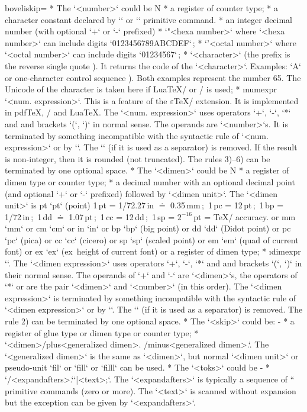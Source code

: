{\begitems \let\_aboveliskip=\relax 
* The `<number>` could be 
\begitems \style N
* a register of counter type;
* a character constant declared by \x`\chardef` or \x`\mathchardef` primitive command. 
* an integer decimal number (with optional `+` or `-` prefixed)
* {\let\,=\relax `"<hexa number>`} where `<hexa number>` can include digits
  `0123456789ABCDEF`\,;
* {\let\,=\relax`'<octal number>`} where `<octal number>` can include digits 
  `01234567`\,;
* {\let\,=\relax {}`<character>`} (the prefix is the reverse single quote ). 
  It returns the code of the `<character>`. Examples:
  `A` or one-character control sequence ).
  Both examples represent the number 65. The Unicode of the character 
  is taken here if Lua\TeX/ or \XeTeX/ is used;
* \i numexpr `\numexpr<num. expression>`.\fnote
  {This is a feature of the $\varepsilon$\TeX/ extension. It is implemented in pdf\TeX, \XeTeX/ and Lua\TeX.}
  The `<num. expression>` uses operators `+`, `-`, `*` and \code{/} and
  brackets `(`, `)` in normal sense. The operands are `<number>`s. It
  is terminated by something incompatible with
  the syntactic rule of `<num. expression>` or by `\relax`.
  The `\relax` (if it is used as a separator) is removed.
  If the result is non-integer, then it is rounded (not truncated).
\enditems
  The rules 3)--6) can be terminated by one optional space.
* The `<dimen>` could be
\begitems \style N
* a register of dimen type or counter type;
* a decimal number with an optional decimal point (and optional `+` or `-`
  prefixed) followed by `<dimen unit>`. The `<dimen unit>` is \ii pt `pt` (point)\fnote 
  {1\,pt = 1/72.27\,in $\doteq$ 0.35\,mm\,;\ 1\,pc = 12\,pt\,;\
   1\,bp = 1/72\,in\,;\ 1\,dd $\doteq$ 1.07\,pt\,;\ 1\,cc = 12\,dd\,;\
   1\,sp = $2^{-16}$\,pt = \TeX/ accuracy.}
  or \ii mm `mm` or \ii cm `cm` or \ii in `in` or 
  \ii bp `bp` (big point) or \ii dd `dd` (Didot point) or \ii pc `pc` (pica) or 
  \ii cc `cc` (cicero) or \ii sp `sp` (scaled point) or \ii em `em` (quad of current font) or
  \ii ex `ex` (ex~height of current font) or a register of dimen type;  
* \i dimexpr `\dimexpr<dimen expression>`.
  The `<dimen expression>` uses operators `+`, `-`, `*` and \code{/} and
  brackets `(`, `)` in their normal sense. The operands of `+` and `-` are
  `<dimen>`s, the operators of `*` or \code{/} are the pair `<dimen>` and
  `<number>` (in this order). The `<dimen expression>`
  is terminated by something incompatible with the
  syntactic rule of `<dimen expression>` or by `\relax`. The `\relax` (if it
  is used as a separator) is removed.
\enditems
  The rule 2) can be terminated by one optional space.
* The `<skip>` could be:
\begitems \style -
* a register of glue type or dimen type or counter type;
* `<dimen>/plus<generalized dimen>. /minus<generalized dimen>.`. The 
  `<generalized dimen>` is the same as `<dimen>`, but normal `<dimen unit>` 
   or pseudo-unit `fil` or `fill` or `filll` can be used.
\enditems
* The `<toks>` could be
\begitems \style -
* `/<expandafters>.`\z`{|<text>};`. The `<expandafters>` is typically a sequence of
  `\expandafter` primitive commands (zero or more). The \z`<text>` is
  scanned without expansion but the exception can be given by 
  `<expandafters>`.
\enditems
\enditems

}
